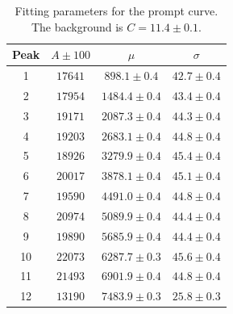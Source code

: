\begin{table}[h]
\centering
\caption{Fitting parameters for the prompt curve. The background is $C=11.4 \pm 0.1$.}
\begin{tabular}{c| ccc}
\toprule
Peak&$A\pm 100$&$\mu$&$\sigma$\\
\midrule
  1&$ 17641$&$ 898.1\pm 0.4 $&$ 42.7\pm 0.4$\\
  2&$ 17954$&$ 1484.4\pm 0.4 $&$ 43.4\pm 0.4$\\
  3&$ 19171$&$ 2087.3\pm 0.4$&$ 44.3\pm 0.4$\\
  4&$ 19203$&$ 2683.1\pm 0.4$&$ 44.8\pm 0.4$\\
  5&$ 18926$&$ 3279.9\pm 0.4$&$ 45.4\pm 0.4$\\
  6&$ 20017$&$ 3878.1\pm 0.4$&$ 45.1\pm 0.4$\\
  7&$ 19590$&$ 4491.0\pm 0.4$&$ 44.8\pm 0.4$\\
  8&$ 20974$&$ 5089.9\pm 0.4$&$ 44.4\pm 0.4$\\
  9&$ 19890$&$ 5685.9\pm 0.4$&$ 44.4\pm 0.4$\\
  10&$ 22073$&$ 6287.7\pm 0.3$&$ 45.6\pm 0.4$\\
  11&$ 21493$&$ 6901.9\pm 0.4$&$ 44.8\pm 0.4$\\
  12&$ 13190$&$ 7483.9\pm 0.3$&$ 25.8\pm 0.3$\\
\bottomrule
\end{tabular}
\label{tab:prompt}
\end{table}

